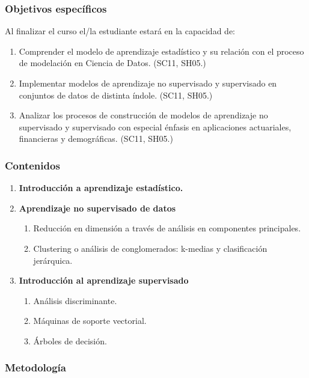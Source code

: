 \begin{refsection}
\subsubsection*{Objetivos específicos}

Al finalizar el curso el/la estudiante estará en la capacidad de:

\begin{enumerate}
\item Comprender el modelo de aprendizaje estadístico y su relación con el proceso de modelación en Ciencia de Datos. (SC11, SH05.)
\item Implementar modelos de aprendizaje no supervisado y supervisado en conjuntos de datos de distinta índole. (SC11, SH05.)
\item Analizar los procesos de construcción de modelos de aprendizaje no supervisado y supervisado con especial énfasis en aplicaciones actuariales, financieras y demográficas. (SC11, SH05.)
\end{enumerate}

\subsubsection*{Contenidos}

\begin{enumerate}
\item \textbf{Introducción a aprendizaje estadístico.}
\item \textbf{Aprendizaje no supervisado de datos}
\begin{enumerate}
\item Reducción en dimensión a través de análisis en componentes principales.
\item Clustering o análisis de conglomerados: k-medias y clasificación jerárquica.
\end{enumerate}
\item \textbf{Introducción al aprendizaje supervisado}
\begin{enumerate}
\item Análisis discriminante.
\item Máquinas de soporte vectorial.
\item Árboles de decisión.
\end{enumerate}
\end{enumerate}

\subsubsection*{Metodología}


\end{refsection}
